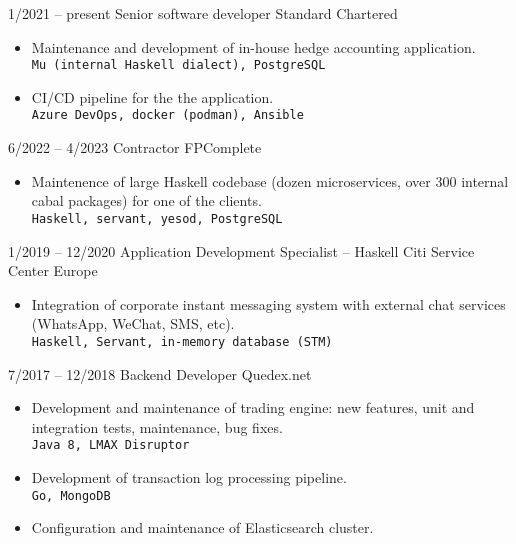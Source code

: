 \documentclass[8pt]{developercv} %
\begin{document}
\begin{entrylist}
	\entry
		{1/2021 -- present}
		{Senior software developer}
		{Standard Chartered}
		{\begin{itemize}
                  \item Maintenance and development of in-house hedge accounting
                    application.\\
                    \texttt{Mu (internal Haskell dialect), PostgreSQL}
                  \item CI/CD pipeline for the the application.\\
                    \texttt{Azure DevOps, docker (podman), Ansible}
                  \end{itemize}
                }
	\entry
		{6/2022 -- 4/2023}
		{Contractor}
		{FPComplete}
		{\begin{itemize}
                  \item Maintenence of large Haskell codebase (dozen microservices, over 300 internal cabal packages) for one of the clients.\\
                    \texttt{Haskell, servant, yesod, PostgreSQL}
                  \end{itemize}
                }                
	\entry
		{1/2019 -- 12/2020}
		{Application Development Specialist -- Haskell}
		{Citi Service Center Europe}
		{\begin{itemize}
                  \item Integration of corporate instant messaging system
                    with external chat services (WhatsApp, WeChat, SMS, etc).\\
                    \texttt{Haskell, Servant, in-memory database (STM)}
                  \end{itemize}
                }
	\entry
		{7/2017 -- 12/2018}
		{Backend Developer}
		{Quedex.net}
		{\begin{itemize}
                  \item Development and maintenance of trading engine:
                    new features, unit and integration tests, maintenance,
                    bug fixes.\\
                    \texttt{Java 8, LMAX Disruptor}
                  \item Development of transaction log processing pipeline.\\
                    \texttt{Go, MongoDB}
                  \item Configuration and maintenance of Elasticsearch cluster.\\

\end{itemize}}
\end{entrylist}
\end{document}
